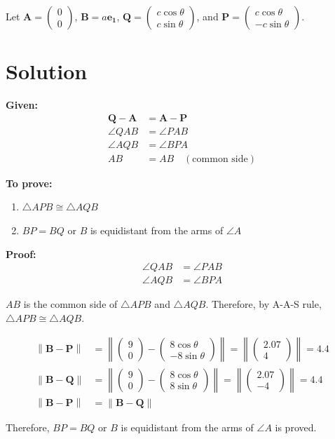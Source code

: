 \documentclass[10pt]{article}
\newcommand{\myvec}[1]{\ensuremath{\begin{pmatrix}#1\end{pmatrix}}}
\let\vec\mathbf
\providecommand{\norm}[1]{\left\lVert#1\right\rVert}
\begin{document}
Let $\vec{A} = \myvec{0\\0}$, $\vec{B} = a\vec{e_1}$, $\vec{Q} = \myvec{c\cos\theta\\c\sin\theta}$, and $\vec{P} = \myvec{c\cos\theta\\-c\sin\theta}$.

\section{Solution}
\textbf{Given:}
\begin{align}
\vec{Q}-\vec{A} &= \vec{A}-\vec{P}\\
\angle{QAB} &= \angle{PAB} \\
\angle{AQB} &= \angle{BPA}\\
AB &= AB \quad (\text{common side})
\end{align}

\textbf{To prove:}
\begin{enumerate}
\item $\triangle{APB} \cong \triangle{AQB}$
\item $BP = BQ$ or $B$ is equidistant from the arms of $\angle{A}$
\end{enumerate}

\textbf{Proof:}
\begin{align}
\angle{QAB} &= \angle{PAB}\\
\angle{AQB} &= \angle{BPA}
\end{align}

$AB$ is the common side of $\triangle{APB}$ and $\triangle{AQB}$. Therefore, by A-A-S rule, $\triangle{APB} \cong \triangle{AQB}$. 

\begin{align}
\norm{\vec{B}-\vec{P}} &= \norm{\myvec{9\\0} - \myvec{8\cos\theta\\-8\sin\theta}} = \norm{\myvec{2.07 \\ 4}} = 4.4\\
\norm{\vec{B}-\vec{Q}} &= \norm{\myvec{9\\0} - \myvec{8\cos\theta\\8\sin\theta}} = \norm{\myvec{2.07 \\ -4}} = 4.4\\
\norm{\vec{B}-\vec{P}} &= \norm{\vec{B}-\vec{Q}}
\end{align}

Therefore, $BP = BQ$ or $B$ is equidistant from the arms of $\angle{A}$ is proved.
\end{document}
